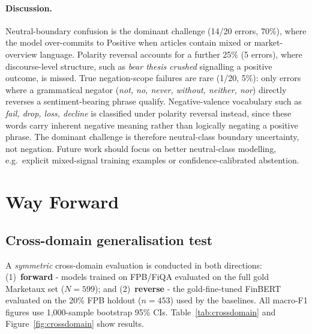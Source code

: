 \documentclass[11pt]{article}
\begin{document}
\paragraph{Discussion.}
Neutral-boundary confusion is the dominant challenge (14/20 errors, 70\%),
where the model over-commits to Positive when articles contain mixed or
market-overview language. Polarity reversal accounts for a further 25\%
(5 errors), where discourse-level structure, such as \textit{bear thesis
crushed} signalling a positive outcome, is missed. True negation-scope failures are rare (1/20, 5\%): only errors where a
grammatical negator (\textit{not, no, never, without, neither, nor})
directly reverses a sentiment-bearing phrase qualify. Negative-valence
vocabulary such as \textit{fail, drop, loss, decline} is classified under
polarity reversal instead, since these words carry inherent negative meaning
rather than logically negating a positive phrase. The dominant challenge is
therefore neutral-class boundary uncertainty, not negation.
Future work should focus on better neutral-class modelling, e.g.\ explicit
mixed-signal training examples or confidence-calibrated abstention.

\section{Way Forward}
\label{sec:forward}

\subsection{Cross-domain generalisation test}

A \textit{symmetric} cross-domain evaluation is conducted in both directions:
(1)~\textbf{forward} - models trained on FPB/FiQA evaluated on the full gold
Marketaux set ($N=599$); and (2)~\textbf{reverse} - the gold-fine-tuned
FinBERT evaluated on the 20\% FPB holdout ($n=453$) used by the baselines.
All macro-F1 figures use 1{,}000-sample bootstrap 95\% CIs.
Table~\ref{tab:crossdomain} and Figure~\ref{fig:crossdomain} show results.
\end{document}
